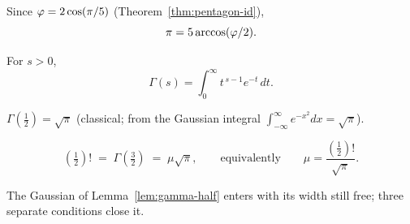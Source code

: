 \begin{proposition}\label{prop:pi-bridge}
Since $\varphi=2\cos(\pi/5)$ (Theorem~\ref{thm:pentagon-id}),
\begin{equation}\label{eq:pi-arccos}
\pi = 5\arccos(\varphi/2).
\end{equation}
\end{proposition}

\begin{proposition}\label{prop:gamma-int}
For $s>0$,
\begin{equation}\label{eq:gamma-int}
\Gamma(s)=\int_0^\infty t^{\,s-1}e^{-t}\,dt .
\end{equation}
\end{proposition}

\begin{lemma}\label{lem:gamma-half}
$\Gamma(\tfrac12)=\sqrt\pi$ (classical; from the Gaussian integral $\int_{-\infty}^{\infty}e^{-x^2}dx=\sqrt\pi$).

\end{lemma}
\medskip
\begin{theorem}\label{thm:half-factorial}
\begin{equation}\label{eq:half-factorial}
(\tfrac12)! \;=\; \Gamma(\tfrac32) \;=\; \mu\sqrt\pi,
\qquad\text{equivalently}\qquad \mu=\frac{(\tfrac12)!}{\sqrt\pi}.
\end{equation}
\end{theorem}
The Gaussian of Lemma~\ref{lem:gamma-half} enters with its width still free; three separate
conditions close it.

